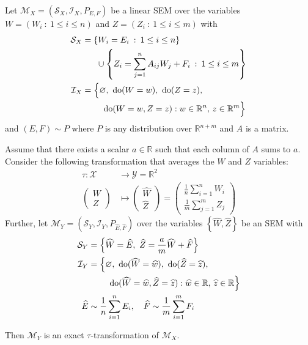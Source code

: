 \medskip

\begin{theorem}\label{theorem:micro-macro}
Let ${\mathcal{M}_X = \left(\mathcal{S}_X, \mathcal{I}_X, P_{E,F} \right)}$ be a linear SEM over the variables ${W=\left( W_i \: : \: 1\leq  i \leq n \right)}$ and ${Z=\left( Z_i \: : \: 1\leq  i \leq m \right)}$ with
%
\begin{align*}
\mathcal{S}_X &= \left\lbrace W_i = E_i \:  : \: 1 \leq i \leq n  \right\rbrace \\
& \quad \ \  \cup \left\lbrace Z_i = \sum_{j=1}^n A_{ij}W_j  + F_{i} \:  : \: 1\leq i \leq m \right\rbrace \\
%
\mathcal{I}_X &= \Big{\{} \nulli, \ \doop(W= w), \ \doop(Z= z), \\
& \qquad\ \doop(W= w, Z= z ) :   w \in \mathbb{R}^{n}, \, z \in \mathbb{R}^m \Big{\}}
%
\end{align*}
%
and $(E,F)  \sim P$ where $P$ is any distribution over $\mathbb{R}^{n+m}$ and $A$ is a matrix.

Assume that there exists a scalar $a\in \mathbb{R}$ such that each column of $A$ sums to $a$. Consider the following transformation that averages the $W$ and $Z$ variables:
%
\begin{align*}
\tau : \mathcal{X} &\rightarrow \mathcal{Y} = \mathbb{R}^2 \\
\begin{pmatrix} W \\ Z \end{pmatrix} &\mapsto \begin{pmatrix} \widehat{W} \\ \widehat{Z} \end{pmatrix} = \begin{pmatrix} \frac{1}{n}\sum_{i=1}^n W_i \\ \frac{1}{m}\sum_{j=1}^m Z_j  \end{pmatrix}
\end{align*}
%
Further, let $\mathcal{M}_Y = \left(\mathcal{S}_Y, \mathcal{I}_Y, P_{\widehat{E},\widehat{F}} \right)$ over the variables ${\left\lbrace \widehat{W}, \widehat{Z} \right\rbrace}$ be an SEM with
%
\begin{align*}
\mathcal{S}_Y &= \Big\lbrace \widehat{W} = \widehat{E}, \ \widehat{Z} = \frac{a}{m}\widehat{W} + \widehat{F} \Big\rbrace \\
%
\mathcal{I}_Y &= \Big{\{} \nulli,\ \doop(\widehat{W}= \widehat{w}), \ \doop(\widehat{Z}= \widehat{z}), \\
& \qquad\ \doop(\widehat{W}= \widehat{w}, \widehat{Z}= \widehat{z} ) :   \widehat{w} \in \mathbb{R}, \, \widehat{z} \in \mathbb{R} \Big{\}} \\
%
\widehat{E}  & \sim \frac{1}{n}\sum_{i=1}^{n} E_i, \quad
\widehat{F}  \sim \frac{1}{m}\sum_{i=1}^{m} F_i
\end{align*}

Then $\mathcal{M}_Y$ is an exact $\tau$-transformation of $\mathcal{M}_X$.
\end{theorem}



